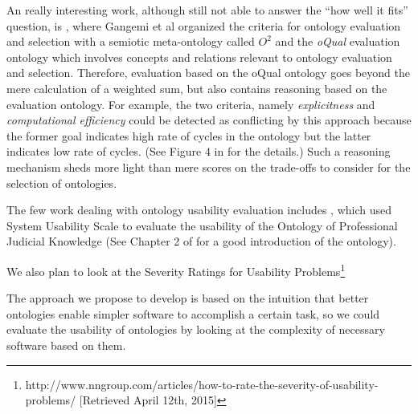 An really interesting work, although still not able to answer the ``how well it fits'' question, is \cite{gangemi2006qood}, where Gangemi et al organized the criteria for ontology evaluation and selection with a semiotic meta-ontology called $O^2$ and the \emph{oQual} evaluation ontology which involves concepts and relations relevant to ontology evaluation and selection. Therefore, evaluation based on the oQual ontology goes beyond the mere calculation of a weighted sum, but also contains reasoning based on the evaluation ontology. For example, the two criteria, namely \emph{explicitness} and \emph{computational efficiency} could be detected as conflicting by this approach because the former goal indicates high rate of cycles in the ontology but the latter indicates low rate of cycles. (See Figure 4 in \cite{gangemi2006qood} for the details.) Such a reasoning mechanism sheds more light than mere scores on the trade-offs to consider for the selection of ontologies.

The few work dealing with ontology usability evaluation includes \cite{casellas2009ontology}, which used System Usability Scale \cite{brooke1996sus} to evaluate the usability of the Ontology of Professional Judicial Knowledge (See Chapter 2 of \cite{casellas2009ontology} for a good introduction of the ontology).

We also plan to look at the Severity Ratings for Usability Problems\footnote{http://www.nngroup.com/articles/how-to-rate-the-severity-of-usability-problems/ [Retrieved April 12th, 2015]}

The approach we propose to develop is based on the intuition that better ontologies enable simpler software to accomplish a certain task, so we could evaluate the usability of ontologies by looking at the complexity of necessary software based on them.
